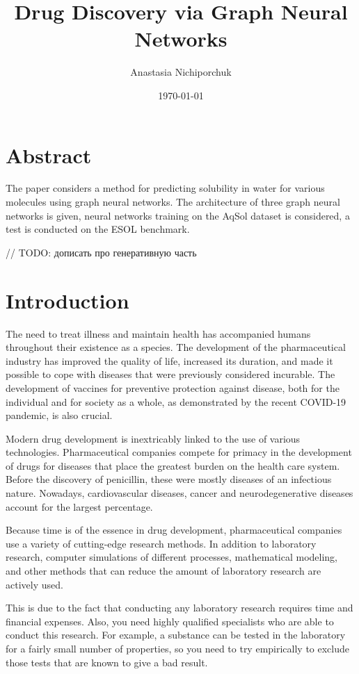 \documentclass[a4paper,14pt]{article}
\author{Anastasia Nichiporchuk}
\title{Drug Discovery via Graph Neural Networks}
\date{\today}
\begin{document}

\maketitle

\newpage
\tableofcontents
\newpage

\section*{Abstract}
The paper considers a method for predicting solubility in water for various molecules using graph neural networks. The architecture of three graph neural networks is given, neural networks training on the AqSol dataset is considered, a test is conducted on the ESOL benchmark.

// TODO: дописать про генеративную часть

\section{Introduction}\label{1}

The need to treat illness and maintain health has accompanied humans throughout their existence as a species. The development of the pharmaceutical industry has improved the quality of life, increased its duration, and made it possible to cope with diseases that were previously considered incurable. The development of vaccines for preventive protection against disease, both for the individual and for society as a whole, as demonstrated by the recent COVID-19 pandemic, is also crucial. 

Modern drug development is inextricably linked to the use of various technologies. Pharmaceutical companies compete for primacy in the development of drugs for diseases that place the greatest burden on the health care system. Before the discovery of penicillin, these were mostly diseases of an infectious nature. Nowadays, cardiovascular diseases, cancer and neurodegenerative diseases account for the largest percentage.

Because time is of the essence in drug development, pharmaceutical companies use a variety of cutting-edge research methods. In addition to laboratory research, computer simulations of different processes, mathematical modeling, and other methods that can reduce the amount of laboratory research are actively used. 


This is due to the fact that conducting any laboratory research requires time and financial expenses. Also, you need highly qualified specialists who are able to conduct this research. For example, a substance can be tested in the laboratory for a fairly small number of properties, so you need to try empirically to exclude those tests that are known to give a bad result.
\end{document}
